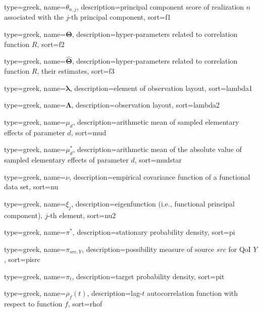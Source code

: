 {
  type=greek,
	name={\ensuremath{\theta_{n,j}}},
	description={principal component score of realization $n$ associated with the $j$-th principal component},
	sort={f1}
}

{
  type=greek,
	name={\ensuremath{\bm{\Theta}}},
	description={hyper-parameters related to correlation function $R$},
	sort={f2}
}

{
  type=greek,
	name={\ensuremath{\widehat{\bm{\Theta}}}},
	description={hyper-parameters related to correlation function $R$, their estimates},
	sort={f3}
}

{
  type=greek,
	name={\ensuremath{\bm{\lambda}}},
	description={element of observation layout},
	sort={lambda1}
}

{
  type=greek,
	name={\ensuremath{\bm{\Lambda}}},
	description={observation layout},
	sort={lambda2}
}

{
  type=greek,
	name={\ensuremath{\mu_d}},
	description={arithmetic mean of sampled elementary effects of parameter $d$},
	sort={mud}
}

{
  type=greek,
	name={\ensuremath{\mu_d^*}},
	description={arithmetic mean of the absolute value of sampled elementary effects of parameter $d$},
	sort={mudstar}
}

{
  type=greek,
	name={\ensuremath{\nu}},
	description={empirical covariance function of a functional data set},
	sort={nu}
}

{
  type=greek,
	name={\ensuremath{\xi_{j}}},
	description={eigenfunction (i.e., functional principal component), $j$-th element},
	sort={nu2}
}

{
  type=greek,
	name={\ensuremath{\pi^*}},
	description={stationary probability density},
	sort={pi}
}

{
  type=greek,
	name={\ensuremath{\pi_{src, Y}}},
	description={possibility measure of source $src$ for QoI $Y$},
	sort={pisrc}
}

{
  type=greek,
	name={\ensuremath{\pi_{t}}},
	description={target probability density},
	sort={pit}
}

{
  type=greek,
	name={\ensuremath{\rho_f (t)}},
	description={lag-$t$ autocorrelation function with respect to function $f$},
	sort={rhof}
}

